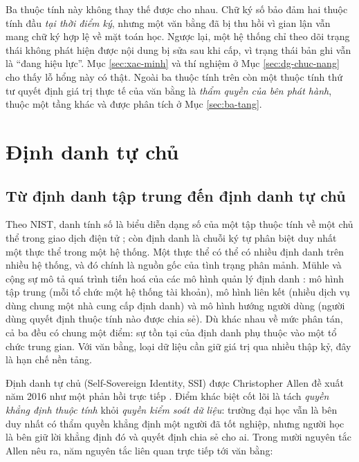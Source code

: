 Ba thuộc tính này không thay thế được cho nhau. Chữ ký số bảo đảm hai thuộc tính đầu \emph{tại thời điểm ký}, nhưng một văn bằng đã bị thu hồi vì gian lận vẫn mang chữ ký hợp lệ về mặt toán học. Ngược lại, một hệ thống chỉ theo dõi trạng thái không phát hiện được nội dung bị sửa sau khi cấp, vì trạng thái bản ghi vẫn là ``đang hiệu lực''. Mục \ref{sec:xac-minh} và thí nghiệm ở Mục \ref{sec:dg-chuc-nang} cho thấy lỗ hổng này có thật. Ngoài ba thuộc tính trên còn một thuộc tính thứ tư quyết định giá trị thực tế của văn bằng là \emph{thẩm quyền của bên phát hành}, thuộc một tầng khác và được phân tích ở Mục \ref{sec:ba-tang}.

\section{Định danh tự chủ}
\label{sec:ssi}

\subsection{Từ định danh tập trung đến định danh tự chủ}

Theo NIST, danh tính số là biểu diễn dạng số của một tập thuộc tính về một chủ thể trong giao dịch điện tử \cite{NIST_SP800_63_3}; còn định danh là chuỗi ký tự phân biệt duy nhất một thực thể trong một hệ thống. Một thực thể có thể có nhiều định danh trên nhiều hệ thống, và đó chính là nguồn gốc của tình trạng phân mảnh. Mühle và cộng sự mô tả quá trình tiến hoá của các mô hình quản lý định danh \cite{Muhle2018}: mô hình tập trung (mỗi tổ chức một hệ thống tài khoản), mô hình liên kết (nhiều dịch vụ dùng chung một nhà cung cấp định danh) và mô hình hướng người dùng (người dùng quyết định thuộc tính nào được chia sẻ). Dù khác nhau về mức phân tán, cả ba đều có chung một điểm: sự tồn tại của định danh phụ thuộc vào một tổ chức trung gian. Với văn bằng, loại dữ liệu cần giữ giá trị qua nhiều thập kỷ, đây là hạn chế nền tảng.

Định danh tự chủ (Self-Sovereign Identity, SSI) được Christopher Allen đề xuất năm 2016 như một phản hồi trực tiếp \cite{Allen2016}. Điểm khác biệt cốt lõi là tách \emph{quyền khẳng định thuộc tính} khỏi \emph{quyền kiểm soát dữ liệu}: trường đại học vẫn là bên duy nhất có thẩm quyền khẳng định một người đã tốt nghiệp, nhưng người học là bên giữ lời khẳng định đó và quyết định chia sẻ cho ai. Trong mười nguyên tắc Allen nêu ra, năm nguyên tắc liên quan trực tiếp tới văn bằng:

